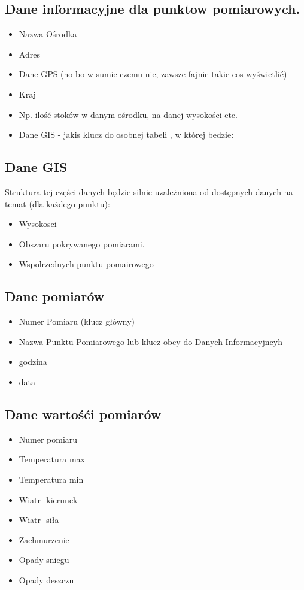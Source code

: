 \documentclass[12pt]{article}
\begin{document}
\subsection{Dane informacyjne dla punktow pomiarowych.}
\begin{itemize}
  \item Nazwa Ośrodka
  \item Adres
  \item Dane GPS (no bo w sumie czemu nie, zawsze fajnie takie cos wyświetlić)
  \item Kraj
  \item Np. ilość stoków w danym ośrodku, na danej wysokości etc.
  \item Dane GIS - jakis klucz do osobnej tabeli , w której bedzie:
  \end{itemize}
\subsection{Dane GIS}
Struktura tej części danych będzie silnie uzależniona od dostępnych danych na temat (dla każdego punktu):
\begin{itemize}
  \item Wysokosci
  \item Obszaru pokrywanego pomiarami.
  \item Wspolrzednych punktu pomairowego
\end{itemize}
\subsection{Dane pomiarów}
\begin{itemize}
  \item Numer Pomiaru (klucz główny)
  \item Nazwa Punktu Pomiarowego lub klucz obcy do Danych Informacyjncyh
  \item godzina
  \item data
\end{itemize}
\subsection{Dane wartośći pomiarów}
  \begin{itemize}
  \item Numer pomiaru
  \item Temperatura max
  \item Temperatura min
  \item Wiatr- kierunek
  \item Wiatr- siła
  \item Zachmurzenie
  \item Opady sniegu
  \item Opady deszczu
\end{itemize}
\end{document}
